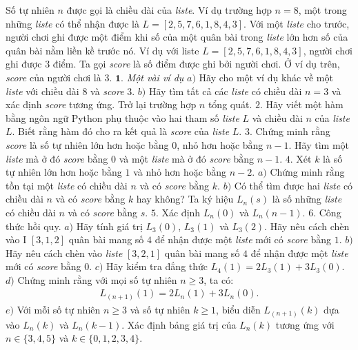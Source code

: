 \begin{multicols}{2}
	\vskip 0.1cm 
	Số tự nhiên $n$ được gọi là chiều dài của \textit{liste}. Ví dụ trường hợp $n=8$, một trong những \textit{liste} có thể nhận được là $L=[2,5,7,6,1,8,4,3]$.
	\vskip 0.1cm 
	Với một \textit{liste} cho trước, người chơi ghi được một điểm khi số của một quân bài trong \textit{liste} lớn hơn số của quân bài nằm liền kề trước nó. Ví dụ với liste $L=[2,5,7,6,1,8,4,3]$, người chơi ghi được $3$ điểm. 
	\vskip 0.1cm
	Ta gọi \textit{score} là số điểm được ghi bởi người chơi. Ở ví dụ trên, \textit{score} của người chơi là $3$.
	\vskip 0.1cm 
	$\pmb{1.}$ \textit{Một vài ví dụ}
	\vskip 0.1cm 
	$a)$ Hãy cho một ví dụ khác về một \textit{liste} với chiều dài $8$ và \textit{score} $3$.
	\vskip 0.1cm 
	$b)$ Hãy tìm tất cả các \textit{liste} có chiều dài $n=3$ và xác định \textit{score} tương ứng. 
	\vskip 0.1cm
	Trở lại trường hợp $n$ tổng quát. 
	\vskip 0.1cm
	$2.$ Hãy viết một hàm bằng ngôn ngữ Python phụ thuộc vào hai tham số \textit{liste} $L$ và chiều dài $n$ của \textit{liste} $L$. Biết rằng hàm đó cho ra kết quả là \textit{score} của \textit{liste} $L$. 
	\vskip 0.1cm
	$3.$ Chứng minh rằng \textit{score} là số tự nhiên lớn hơn hoặc bằng $0$, nhỏ hơn hoặc bằng $n-1$. Hãy tìm một \textit{liste} mà ở đó \textit{score} bằng $0$ và một \textit{liste} mà ở đó \textit{score} bằng $n-1$.
	\vskip 0.1cm 
	$4.$ Xét $k$ là số tự nhiên lớn hơn hoặc bằng $1$ và nhỏ hơn hoặc bằng $n-2$.
	\vskip 0.1cm 
	$a)$ Chứng minh rằng tồn tại một \textit{liste} có chiều dài $n$ và có \textit{score} bằng $k$.
	\vskip 0.1cm 
	$b)$ Có thể tìm được hai \textit{liste} có chiều dài $n$ và có \textit{score} bằng $k$ hay không?
	\vskip 0.1cm 
	Ta ký hiệu $L_n(s)$ là số những \textit{liste} có chiều dài $n$ và có \textit{score} bằng $s$.
	\vskip 0.1cm 
	$5.$ Xác định $L_n(0)$ và $L_n (n-1)$.
	\vskip 0.1cm 
	$6.$ Công thức hồi quy.
	\vskip 0.1cm
	$a)$ Hãy tính giá trị $L_3 (0)$, $L_3 (1)$ và $L_3 (2)$. Hãy nêu cách chèn vào I $[3,1,2]$ quân bài mang số $4$ để nhận được một \textit{liste} mới có \textit{score} bằng $1$.
	\vskip 0.1cm 
	$b)$ Hãy nêu cách chèn vào \textit{liste} $[3,2,1]$ quân bài mang số $4$ để nhận được một \textit{liste} mới có \textit{score} bằng $0$.
	\vskip 0.1cm
	$c)$ Hãy kiểm tra đẳng thức $L_4 (1)=2L_3 (1)+3L_3 (0)$.
	\vskip 0.1cm
	$d)$ Chứng minh rằng với mọi số tự nhiên $n\ge3$, ta có:
	\begin{align*}
		L_(n+1) (1)=2L_n (1)+3L_n (0).
	\end{align*}
	$e)$ Với mỗi số tự nhiên $n\ge3$ và số tự nhiên $k\ge1$, biểu diễn $L_(n+1) (k)$ dựa vào $L_n (k)$ và $L_n (k-1)$.
	\vskip 0.1cm 
	Xác định bảng giá trị của $L_n (k)$ tương ứng với $n \in \{3,4,5\}$ và $k \in \{0,1,2,3,4\}$.

\end{multicols}
